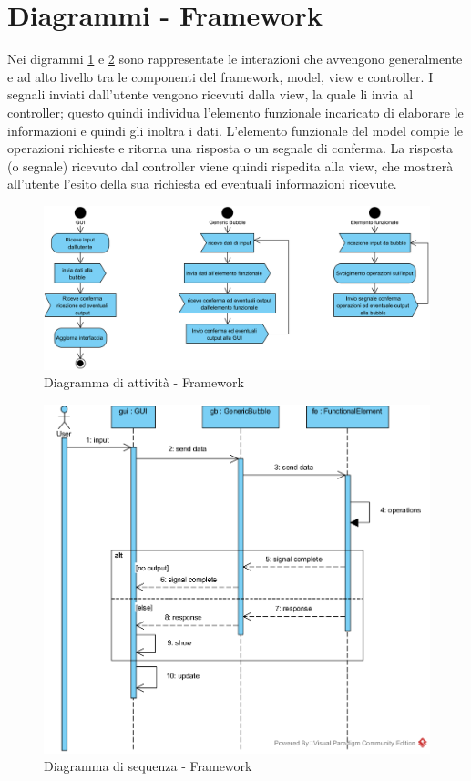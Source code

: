 \section{Diagrammi - Framework}

Nei digrammi \ref{fig:alt_framework} e \ref{fig:seq_framework} sono rappresentate le interazioni che avvengono generalmente e ad alto
livello tra le componenti del framework, model, view e controller. I segnali inviati dall’utente
vengono ricevuti dalla view, la quale li invia al controller; questo quindi individua l’elemento
funzionale incaricato di elaborare le informazioni e quindi gli inoltra i dati. L’elemento funzionale
del model compie le operazioni richieste e ritorna una risposta o un segnale di conferma. La risposta (o segnale) ricevuto dal controller viene quindi rispedita alla view, che mostrerà all’utente l’esito della sua richiesta ed eventuali informazioni ricevute.

\begin{figure}[H]
	\centering
	\includegraphics[width=14cm]{diagrammi_img/attivita/framework.png}
	\caption{Diagramma di attività - Framework}
	\label{fig:alt_framework}
\end{figure}

\begin{figure}[H]
	\centering
	\includegraphics[width=14cm]{diagrammi_img/sequenza/framework.png}
	\caption{Diagramma di sequenza - Framework}
	\label{fig:seq_framework}
\end{figure}

